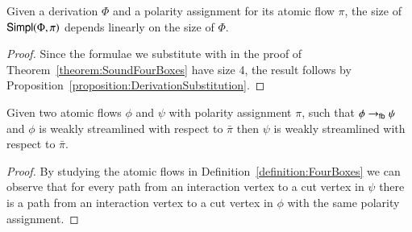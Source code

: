 
\begin{lemma}\label{lemma:SizeFourBoxes}
Given a derivation $\Phi$ and a polarity assignment for its atomic flow $\pi$, the size of $\mathsf{Simpl}(\Phi,\pi)$ depends linearly on the size of $\Phi$.
\end{lemma}

\begin{proof}
Since the formulae we substitute with in the proof of Theorem~\vref{theorem:SoundFourBoxes} have size 4, the result follows by Proposition~\vref{proposition:DerivationSubstitution}.
\end{proof}

\begin{lemma}\label{lemma:FourBoxesStreamlining}
Given two atomic flows $\phi$ and $\psi$ with polarity assignment $\pi$, such that $\phi\to_{\mathsf{fb}}\psi$ and $\phi$ is weakly streamlined with respect to $\bar\pi$ then $\psi$ is weakly streamlined with respect to $\bar\pi$.
\end{lemma}

\begin{proof}
By studying the atomic flows in Definition~\vref{definition:FourBoxes} we can observe that for every path from an interaction vertex to a cut vertex in $\psi$ there is a path from an interaction vertex to a cut vertex in $\phi$ with the same polarity assignment.
\end{proof}
